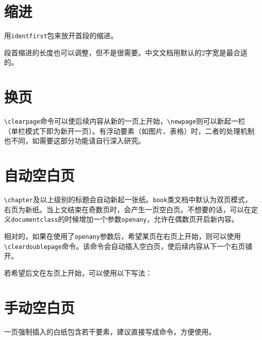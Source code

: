 \documentclass[10pt,openany]{book}
\begin{document}
\begin{sloppypar}
    

    \section{缩进}

    用\texttt{identfirst}包来放开首段的缩进。

    

    段首缩进的长度也可以调整，但不是很需要。中文文档用默认的2字宽是最合适的。

    

    \section{换页}

    \texttt{\textbackslash{}clearpage}命令可以使后续内容从新的一页上开始，\texttt{\textbackslash{}newpage}则可以新起一栏（单栏模式下即为新开一页）。有浮动要素（如图片、表格）时，二者的处理机制也不同，如需要这部分功能请自行深入研究。

    \section{自动空白页}

    \texttt{\textbackslash{}chapter}及以上级别的标题会自动新起一张纸。\texttt{book}类文档中默认为双页模式，右页为新纸。当上文结束在奇数页时，会产生一页空白页。不想要的话，可以在定义\texttt{documentclass}的时候增加一个参数\texttt{openany}，允许在偶数页开启新内容。

    

    相对的，如果在使用了\texttt{openany}参数后，希望某页在右页上开始，则可以使用\texttt{\textbackslash{}cleardoublepage}命令。该命令会自动插入空白页，使后续内容从下一个右页铺开。

    若希望后文在左页上开始，可以使用以下写法：

    

    \section{手动空白页}

    一页强制插入的白纸包含若干要素，建议直接写成命令，方便使用。


\end{sloppypar}
\end{document}

